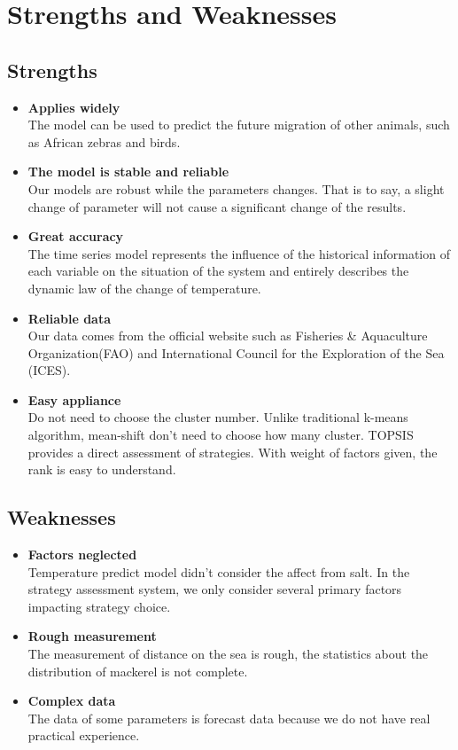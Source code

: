\documentclass{mcmthesis}
\begin{document}
\section{Strengths and Weaknesses}
\subsection{Strengths}
\begin{itemize}
\item \textbf{Applies widely}\\
The model can be used to predict the future migration of other animals, such as African zebras and birds.
\item \textbf{The model is stable and reliable}\\
Our models are robust while the parameters changes. That is to say, a slight
change of parameter will not cause a significant change of the results.

\item \textbf{Great accuracy}\\
The time series model represents the influence of the historical information of each variable on the situation of the system and entirely describes the dynamic law of the change of temperature.

\item \textbf{Reliable data}\\
Our data comes from the official website such as Fisheries \& Aquaculture Organization(FAO) and
International Council for the Exploration of the Sea (ICES).
\item \textbf{Easy appliance}\\
Do not need to choose the cluster number. Unlike traditional k-means algorithm, mean-shift don’t need to choose how many cluster. TOPSIS provides a direct assessment of strategies. With weight of factors given, the rank is easy to understand.\\
\end{itemize}


\subsection{Weaknesses}
\begin{itemize}
\item \textbf{Factors neglected}\\
Temperature predict model didn’t consider the affect from salt. In the strategy assessment system, we only consider several primary factors impacting strategy choice.
\item \textbf{Rough measurement}\\
The measurement of distance on the sea is rough, the statistics about the distribution of mackerel is not complete.
\item \textbf{Complex data}\\
The data of some parameters is forecast data because we do not have real practical
experience.
\end{itemize}
\clearpage
\end{document}
